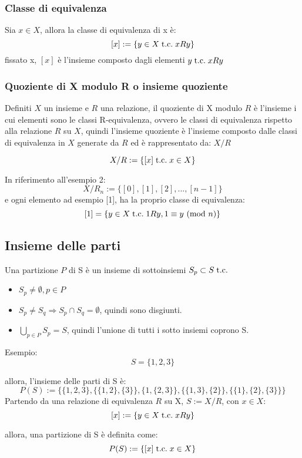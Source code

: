 \documentclass[a4paper,12pt]{article}
\newcommand{\rel}[1][R]{R}
\newcommand{\Mod}[1]{\ (\mathrm{mod}\ #1)}
\begin{document}
	\subsubsection{Classe di equivalenza}
	Sia $x \in X$, allora la classe di equivalenza di x è:
	\[[x] := \{y \in X \tc x \rel y\}\]
	fissato x, $[x]$ è l'insieme composto dagli elementi $y \tc x\rel y$
	
	\subsubsection{Quoziente di X modulo R o insieme quoziente}
	Definiti $X$ un insieme e $\rel$ una relazione, il quoziente di X modulo $\rel$ è l'insieme i cui elementi sono le classi R-equivalenza, ovvero le classi di equivalenza rispetto alla relazione $\rel$ su $X$, quindi l'insieme quoziente è l'insieme composto dalle classi di equivalenza in $X$ generate da $\rel$ ed è rappresentato da: $X/R$
	
	\[
	X/R := \{[x] \;\text{t.c.}\; x \in X\}
	\]
	
	In riferimento all'esempio 2:
	\[
	X/R_n := \{[0], [1], [2], ... , [n-1]\} %
	\]e ogni elemento ad esempio [1], ha la proprio classe di equivalenza:
	\[
	[1] = \{y \in X \tc 1\rel y, 1 \equiv y \Mod{n}\}
	\]
	
	\subsection{Insieme delle parti}
	Una partizione $P$ di S è un insieme di sottoinsiemi $S_p \subset S \;\text{t.c.}\;$
	\begin{itemize}
		\item $S_p \not = \emptyset, p \in P$
		\item $S_p \not = S_q \Rightarrow S_p \cap S_q = \emptyset$, quindi sono disgiunti.
		\item $\displaystyle \bigcup_{p \in P} S_p = S$, quindi l'unione di tutti i sotto insiemi coprono S.
	\end{itemize}
	
	Esempio:
	\[S = \{1,2,3\}\]
	
	allora, l'insieme delle parti di S è:
	\[P(S) := \{\{1,2,3\},\{\{1,2\}, \{3\}\},\{1,\{2,3\}\}, \{\{1,3\},\{2\}\},\{\{1\},\{2\},\{3\}\}\}\]
	Partendo da una relazione di equivalenza $\rel$ su X, $S := X/\rel$, con $x \in X$:
	\[[x] := \{y \in X \tc x \rel y\}\]
	
	allora, una partizione di S è definita come:
	\[P(S) := \{[x] \;\text{t.c.}\; x \in X\}\]
	
\end{document}
